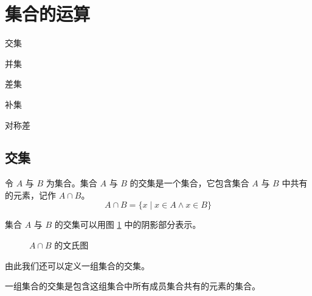 \section{集合的运算}
\begin{introduction}
    \item 交集
    \item 并集
    \item 差集
    \item 补集
    \item 对称差
\end{introduction}

\subsection{交集}
\begin{definition}[集合的交集]\label{def:交集}
    令 $A$ 与 $B$ 为集合。集合 $A$ 与 $B$ 的交集是一个集合，它包含集合 $A$ 与 $B$ 中共有的元素，记作 $A \cap B$。
    \begin{equation*}
        A \cap B = \{x \mid x \in A \land x \in B \}
    \end{equation*}
\end{definition}

集合 $A$ 与 $B$ 的交集可以用图 \ref{fig:交集文氏图} 中的阴影部分表示。
\begin{figure}[htbp!]
    \centering
    \caption{$A \cap B$ 的文氏图}
    \label{fig:交集文氏图}
\end{figure}

由此我们还可以定义一组集合的交集。
\begin{definition}[多个集合的交集]\label{def:多个交集}
    一组集合的交集是包含这组集合中所有成员集合共有的元素的集合。
\end{definition}


